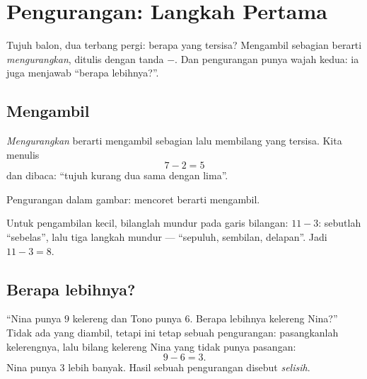 \chapter{Pengurangan: Langkah Pertama}\label{ch:g1:subtraction}

Tujuh balon, dua terbang pergi: berapa yang tersisa? Mengambil
sebagian berarti \emph{mengurangkan}, ditulis dengan tanda $-$. Dan
pengurangan punya wajah kedua: ia juga menjawab ``berapa lebihnya?''.

\section{Mengambil}

\begin{definition}[Pengurangan]\label{def:g1:subtraction:def}
\emph{Mengurangkan} berarti mengambil sebagian lalu membilang yang
tersisa. Kita menulis
\[
7 - 2 = 5
\]
dan dibaca: ``tujuh kurang dua sama dengan lima''.
\end{definition}

\begin{omfigure}

{\small Pengurangan dalam gambar: mencoret berarti mengambil.}
\end{omfigure}

\begin{example}\label{ex:g1:subtraction:countback}
Untuk pengambilan kecil, bilanglah mundur pada garis bilangan:
$11 - 3$: sebutlah ``sebelas'', lalu tiga langkah mundur ---
``sepuluh, sembilan, delapan''. Jadi $11 - 3 = 8$.
\end{example}

\section{Berapa lebihnya?}

\begin{example}[Selisih]\label{ex:g1:subtraction:difference}
``Nina punya $9$ kelereng dan Tono punya $6$. Berapa lebihnya
kelereng Nina?'' Tidak ada yang diambil, tetapi ini tetap sebuah
pengurangan: pasangkanlah kelerengnya, lalu bilang kelereng Nina yang
tidak punya pasangan:
\[
9 - 6 = 3 .
\]
Nina punya $3$ lebih banyak. Hasil sebuah pengurangan disebut
\emph{selisih}.
\end{example}

